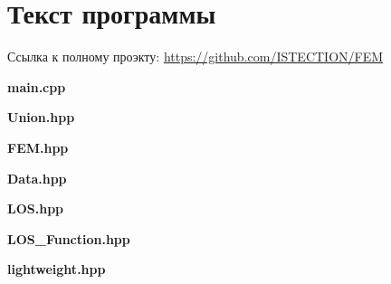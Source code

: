 \documentclass[12pt,a4paper]{article}
\begin{document}
\newpage
\section{Текст программы}

Ссылка к полному проэкту:
\href{https://github.com/ISTECTION/FEM}{https://github.com/ISTECTION/FEM}

\begin{myquote}
    \begin{center}
        \textbf{main.cpp}
    \end{center}
\end{myquote}

\begin{myquote}
    \begin{center}
        \textbf{Union.hpp}
    \end{center}
\end{myquote}

\begin{myquote}
    \begin{center}
        \textbf{FEM.hpp}
    \end{center}
\end{myquote}

\begin{myquote}
    \begin{center}
        \textbf{Data.hpp}
    \end{center}
\end{myquote}

\begin{myquote}
    \begin{center}
        \textbf{LOS.hpp}
    \end{center}
\end{myquote}

\begin{myquote}
    \begin{center}
        \textbf{LOS\_Function.hpp}
    \end{center}
\end{myquote}

\begin{myquote}
    \begin{center}
        \textbf{lightweight.hpp}
    \end{center}
\end{myquote}
\end{document}
